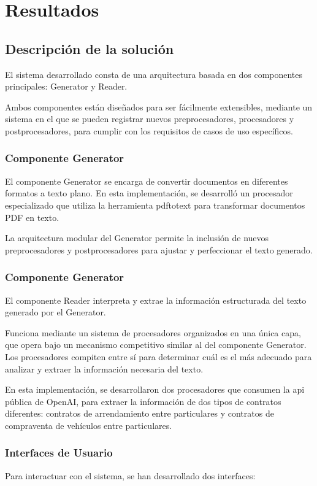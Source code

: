 \chapter{Resultados}\label{ch:chapter_5}


\section{Descripción de la solución}
El sistema desarrollado consta de una arquitectura basada en dos componentes principales: Generator y Reader.

Ambos componentes están diseñados para ser fácilmente extensibles, mediante un sistema en el que se pueden registrar
nuevos preprocesadores, procesadores y postprocesadores, para cumplir con los requisitos de casos de uso específicos.

\subsection*{Componente Generator}
El componente Generator se encarga de convertir documentos en diferentes formatos a texto plano.
En esta implementación, se desarrolló un procesador especializado que utiliza la herramienta pdftotext para transformar
documentos PDF en texto.

La arquitectura modular del Generator permite la inclusión de nuevos preprocesadores y postprocesadores para ajustar y
perfeccionar el texto generado.

\subsection*{Componente Generator}
El componente Reader interpreta y extrae la información estructurada del texto generado por el Generator.

Funciona mediante un sistema de procesadores organizados en una única capa, que opera bajo un mecanismo competitivo
similar al del componente Generator.
Los procesadores compiten entre sí para determinar cuál es el más adecuado para analizar y extraer la información
necesaria del texto.

En esta implementación, se desarrollaron dos procesadores que consumen la api pública de OpenAI, para extraer la
información de dos tipos de contratos diferentes: contratos de arrendamiento entre particulares y contratos de
compraventa de vehículos entre particulares.

\subsection*{Interfaces de Usuario}
Para interactuar con el sistema, se han desarrollado dos interfaces:

